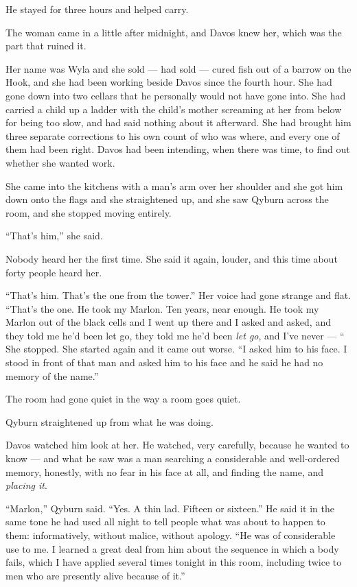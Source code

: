 He stayed for three hours and helped carry.

\sceneBreak

The woman came in a little after midnight, and Davos knew her, which was the part that ruined it.

Her name was Wyla and she sold — had sold — cured fish out of a barrow on the Hook, and she had been working beside Davos since the fourth hour. She had gone down into two cellars that he personally would not have gone into. She had carried a child up a ladder with the child’s mother screaming at her from below for being too slow, and had said nothing about it afterward. She had brought him three separate corrections to his own count of who was where, and every one of them had been right. Davos had been intending, when there was time, to find out whether she wanted work.

She came into the kitchens with a man’s arm over her shoulder and she got him down onto the flags and she straightened up, and she saw Qyburn across the room, and she stopped moving entirely.

“That’s him,” she said.

Nobody heard her the first time. She said it again, louder, and this time about forty people heard her.

“That’s him. That’s the one from the tower.” Her voice had gone strange and flat. “That’s the one. He took my Marlon. Ten years, near enough. He took my Marlon out of the black cells and I went up there and I asked and asked, and they told me he’d been let go, they told me he’d been \textit{let go}, and I’ve never — “ She stopped. She started again and it came out worse. “I asked him to his face. I stood in front of that man and asked him to his face and he said he had no memory of the name.”

The room had gone quiet in the way a room goes quiet.

Qyburn straightened up from what he was doing.

Davos watched him look at her. He watched, very carefully, because he wanted to know — and what he saw was a man searching a considerable and well-ordered memory, honestly, with no fear in his face at all, and finding the name, and \textit{placing it}.

“Marlon,” Qyburn said. “Yes. A thin lad. Fifteen or sixteen.” He said it in the same tone he had used all night to tell people what was about to happen to them: informatively, without malice, without apology. “He was of considerable use to me. I learned a great deal from him about the sequence in which a body fails, which I have applied several times tonight in this room, including twice to men who are presently alive because of it.”

